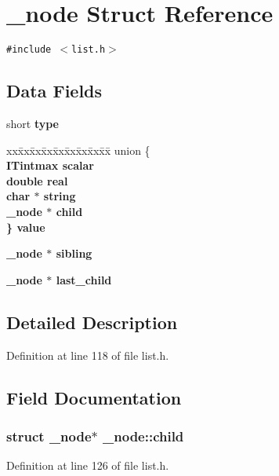 \section{\_\-node Struct Reference}
\label{struct__node}
{\tt \#include $<$list.h$>$}

\subsection*{Data Fields}
\begin{CompactItemize}
\item 
short \bf{type}
\item 
\begin{tabbing}
xx\=xx\=xx\=xx\=xx\=xx\=xx\=xx\=xx\=\kill
union \{\\
\>\bf{ITintmax} \bf{scalar}\\
\>double \bf{real}\\
\>char $\ast$ \bf{string}\\
\>\bf{\_node} $\ast$ \bf{child}\\
\} \bf{value}\\

\end{tabbing}\item 
\bf{\_\-node} $\ast$ \bf{sibling}
\item 
\bf{\_\-node} $\ast$ \bf{last\_\-child}
\end{CompactItemize}


\subsection{Detailed Description}




Definition at line 118 of file list.h.

\subsection{Field Documentation}
\subsubsection{\setlength{\rightskip}{0pt plus 5cm}struct \bf{\_\-node}$\ast$ \bf{\_\-node::child}}\label{struct__node_e5878e6d82f08d42e54d14d8a12317c9}




Definition at line 126 of file list.h.
